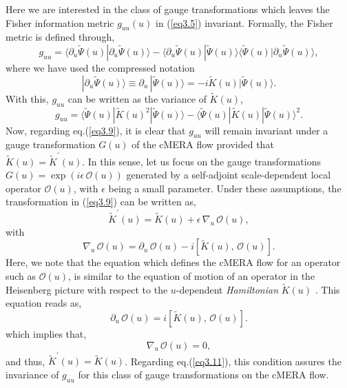 \documentclass[preprint,aps]{revtex4}
\def\beq{\begin{equation}}
\def\eeq{\end{equation}}
\begin{document}
Here we are interested in the class of gauge transformations which leaves the Fisher information metric $g_{uu}(u)$ in (\ref{eq3.5}) invariant. Formally, the Fisher metric is defined through,
\beq
\label{eq3.10}
g_{uu}=\langle \partial_u \widetilde{\Psi}(u) |\partial_u \widetilde{\Psi}(u)\rangle - \langle \partial_u \widetilde{\Psi}(u) | \widetilde{\Psi}(u)\rangle \langle \widetilde{\Psi}(u) |\partial_u \widetilde{\Psi}(u)\rangle,
\eeq
where we have used the compressed notation
\beq
\label{eq3.10i}
|\partial_u \widetilde{\Psi}(u)\rangle\equiv \partial_u\, |\widetilde{\Psi}(u)\rangle = -i\widetilde{K}(u)|\widetilde{\Psi}(u)\rangle.
\eeq
With this, $g_ {uu}$ can be written as the variance of $\widetilde{K}(u)$,
\beq
\label{eq3.11}
g_{uu}=\langle \widetilde{\Psi}(u) |\widetilde{K}(u)^2| \widetilde{\Psi}(u)\rangle - \langle  \widetilde{\Psi}(u) | \widetilde{K}(u)|\widetilde{\Psi}(u)\rangle^2 .
\eeq
Now, regarding eq.(\ref{eq3.9}), it is clear that $g_{uu}$ will remain invariant under a gauge transformation $G(u)$ of the cMERA flow provided that $\widetilde{K}(u) =   \widetilde{K}^{'}(u)$. In this sense, let us focus on the gauge transformations $G(u)=\exp \left( i\epsilon\, \mathcal{O}(u) \right)$ generated by a self-adjoint scale-dependent local operator $\mathcal{O}(u)$, with $\epsilon$ being a small parameter. Under these assumptions, the transformation in (\ref{eq3.9}) can be written as,
\beq
\label{eq3.12}
\widetilde{K}^{'}(u) =\widetilde{K}(u) + \epsilon\, \nabla_u\,  \mathcal{O}(u),   
\eeq
with
\beq
\label{eq3.12x}
\nabla_u\, \mathcal{O}(u) =  \partial_u\, \mathcal{O}(u)-i\left[\widetilde{K}(u),\, \mathcal{O}(u) \right].
\eeq
Here, we note that the equation which defines the cMERA flow for an operator such as $\mathcal{O}(u)$, is similar to the equation of motion of an operator in the Heisenberg picture with respect to the $u$-dependent \textit{Hamiltonian} $\widetilde{K}(u)$ \cite{cMERA}. This equation reads as,
\beq
\label{eq3.13}
\partial_u\, \mathcal{O}(u)=i\left[\widetilde{K}(u),\, \mathcal{O}(u) \right]. 
\eeq
which implies that,
\beq
\label{eq3.14}
\nabla_u\,  \mathcal{O}(u)=0,
\eeq
and thus, $\widetilde{K}^{'}(u)=\widetilde{K}(u)$. Regarding eq.(\ref{eq3.11}), this condition assures the invariance of $g_{uu}$ for this class of gauge transformations on the cMERA flow.
\end{document}
